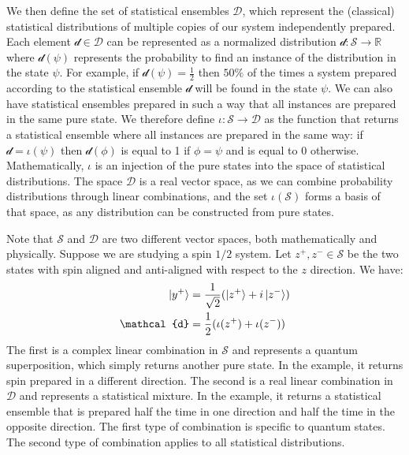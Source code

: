 \documentclass[applsci,article,submit,moreauthors,pdftex]{Definitions/mdpi}
\begin{document}
We then define the set of statistical ensembles $\mathcal{D}$, which represent the (classical) statistical distributions of multiple copies of our system independently prepared. Each element $\mathcal{d} \in \mathcal{D}$ can be represented as a normalized distribution $\mathcal{d}: \mathcal{S} \to \mathbb{R}$ where $\mathcal{d}(\psi)$ represents the probability to find an instance of the distribution in the state $\psi$. For example, if $\mathcal{d}(\psi) = \frac{1}{2}$ then $50\%$ of the times a system prepared according to the statistical ensemble $\mathcal{d}$ will be found in the state $\psi$. We can also have statistical ensembles prepared in such a way that all instances are prepared in the same pure state. We therefore define $\iota : \mathcal{S} \to \mathcal{D}$ as the function that returns a statistical ensemble where all instances are prepared in the same way: if $\mathcal{d}=\iota(\psi)$ then $\mathcal{d}(\phi)$ is equal to 1 if $\phi = \psi$ and is equal to 0 otherwise. Mathematically, $\iota$ is an injection of the pure states into the space of statistical distributions. The space $\mathcal{D}$ is a real vector space, as we can combine probability distributions through linear combinations, and the set $\iota(\mathcal{S})$ forms a basis of that space, as any distribution can be constructed from pure states.

Note that $\mathcal{S}$ and $\mathcal{D}$ are two different vector spaces, both mathematically and physically. Suppose we are studying a spin $1/2$ system. Let $z^+, z^- \in \mathcal{S}$ be the two states with spin aligned and anti-aligned with respect to the $z$ direction. We have:
\begin{equation}
\begin{aligned}
\ket{y^+} &= \frac{1}{\sqrt{2}} (\ket{z^+} + i \ket{z^-}) \\
\mathcal{d}&= \frac{1}{2} (\iota(z^+) + \iota(z^-))
\end{aligned}
\end{equation}
The first is a complex linear combination in $\mathcal{S}$ and represents a quantum superposition, which simply returns another pure state. In the example, it returns spin prepared in a different direction. The second is a real linear combination in $\mathcal{D}$ and represents a statistical mixture. In the example, it returns a statistical ensemble that is prepared half the time in one direction and half the time in the opposite direction. The first type of combination is specific to quantum states. The second type of combination applies to all statistical distributions.
\end{document}
